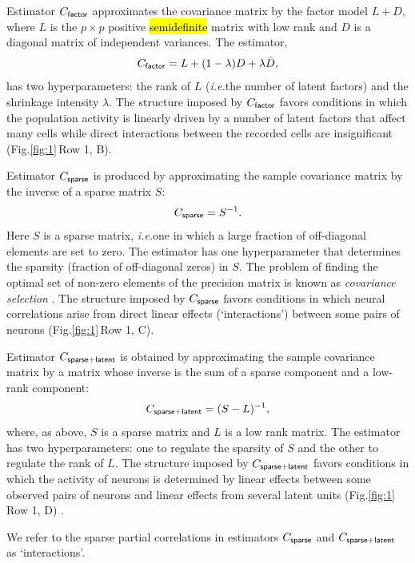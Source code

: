 \documentclass[10pt]{article}
\newcommand{\sq}[1]{\lq#1\rq}
\newcommand{\figref}[2]{Fig.\;\ref{fig:#1}\,#2}
\newcommand{\ie}{\emph{i.e.}\;}
\begin{document}
Estimator $C_{\sf factor}$ approximates the covariance matrix by the factor model $L + D$, where $L$ is the $p\times p$ positive \hl{semidefinite} matrix with low rank and $D$ is a diagonal matrix of independent variances. The estimator, 
\begin{equation}\label{eq:c-factor}
C_{\sf factor} = L + (1-\lambda)D + \lambda \bar D,
\end{equation}
has two hyperparameters: the rank of $L$ (\ie the number of latent factors) and the shrinkage intensity $\lambda$. The structure imposed by $C_{\sf factor}$ favors conditions in which the population activity is linearly driven by a number of latent factors that affect many cells while direct interactions between the recorded cells are insignificant (\figref{1}{Row 1, B}).   

Estimator $C_{\sf sparse}$ is produced by approximating the sample covariance matrix by the inverse of a sparse matrix $S$: 
\begin{equation}\label{eq:c-sparse}
C_{\sf sparse} = S^{-1}.
\end{equation}
Here $S$ is a sparse matrix, \ie one in which a large fraction of off-diagonal elements are set to zero.  The estimator has one hyperparameter that determines the sparsity (fraction of off-diagonal zeros) in $S$. The problem of finding the optimal set of non-zero elements of the precision matrix is known as \emph{covariance selection} \cite{Dempster:1972}. The structure imposed by $C_{\sf sparse}$ favors conditions in which neural correlations arise from direct linear effects (\sq{interactions}) between some pairs of neurons (\figref{1}{Row 1, C}).  


Estimator $C_{\sf sparse+latent}$ is obtained by approximating the sample covariance matrix by a matrix whose inverse is the sum of a sparse component and a low-rank component: 
\begin{equation}\label{eq:c-sl}
C_{\sf sparse+latent} = (S - L)^{-1},
\end{equation}
where, as above, $S$ is a sparse matrix and $L$ is a low rank matrix. The estimator has two hyperparameters: one to regulate the sparsity of $S$ and the other to regulate the rank of $L$. The structure imposed by $C_{\sf sparse+latent}$ favors conditions in which the activity of neurons is determined by linear effects between some observed pairs of neurons and linear effects from several latent units (\figref{1}{Row 1, D}) \cite{Chandrasekaran:2010,Ma:2013}.

We refer to the sparse partial correlations in estimators $C_{\sf sparse}$ and $C_{\sf sparse+latent}$ as \sq{interactions}.
\end{document}
